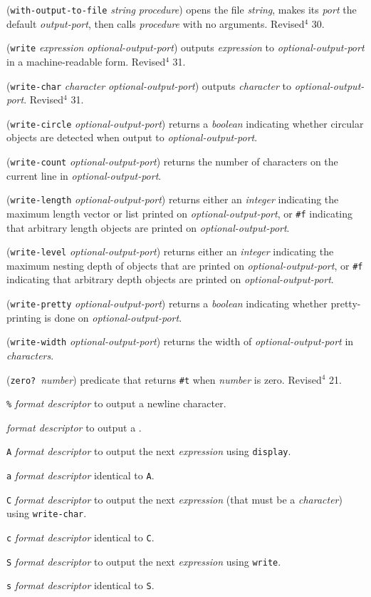 \documentclass[10pt,twocolumn]{article}
\begin{document}
(\texttt{with-output-to-file}  \emph{string} \emph{procedure}) opens the file
\emph{string}, makes its \emph{port} the default \emph{output-port}, then
calls \emph{procedure} with no arguments.  Revised$^4$ 30.

(\texttt{write} \emph{expression} \emph{optional-output-port}) outputs
\emph{expression} to \emph{optional-output-port} in a machine-readable
form.  Revised$^4$ 31.

(\texttt{write-char} \emph{character} \emph{optional-output-port}) outputs
\emph{character} to \emph{optional-output-port}.  Revised$^4$ 31.

(\texttt{write-circle} \emph{optional-output-port}) returns a
\emph{boolean} indicating whether circular objects are detected
when output to \emph{optional-output-port}.

(\texttt{write-count} \emph{optional-output-port}) returns the number of
characters on the current line in \emph{optional-output-port}.

(\texttt{write-length} \emph{optional-output-port}) returns either an
\emph{integer} indicating the maximum length vector or list
printed on \emph{optional-output-port}, or \texttt{\#f} indicating that
arbitrary length objects are printed on \emph{optional-output-port}.

(\texttt{write-level} \emph{optional-output-port}) returns either an
\emph{integer} indicating the maximum nesting depth of objects
that are printed on \emph{optional-output-port}, or \texttt{\#f} indicating
that arbitrary depth objects are printed on \emph{optional-output-port}.

(\texttt{write-pretty} \emph{optional-output-port}) returns a
\emph{boolean} indicating whether pretty-printing is done on
\emph{optional-output-port}.

(\texttt{write-width} \emph{optional-output-port}) returns the width of
\emph{optional-output-port} in \emph{characters}.

(\texttt{zero?}\ \emph{number}) predicate that returns \texttt{\#t} when \emph{number}
is zero.  Revised$^4$ 21.

\texttt{\texttildelow\%} \emph{format descriptor} to output a newline character.

\texttt{\texttildelow\texttildelow} \emph{format descriptor} to output a \texttt{\texttildelow}.

\texttt{\texttildelow{}A} \emph{format descriptor} to output the next \emph{expression} using
\texttt{display}.

\texttt{\texttildelow{}a} \emph{format descriptor} identical to \texttt{\texttildelow{}A}.

\texttt{\texttildelow{}C} \emph{format descriptor} to output the next \emph{expression} (that
must be a \emph{character}) using \texttt{write-char}.

\texttt{\texttildelow{}c} \emph{format descriptor} identical to \texttt{\texttildelow{}C}.

\texttt{\texttildelow{}S} \emph{format descriptor} to output the next \emph{expression} using
\texttt{write}.

\texttt{\texttildelow{}s} \emph{format descriptor} identical to \texttt{\texttildelow{}S}.
\end{document}

